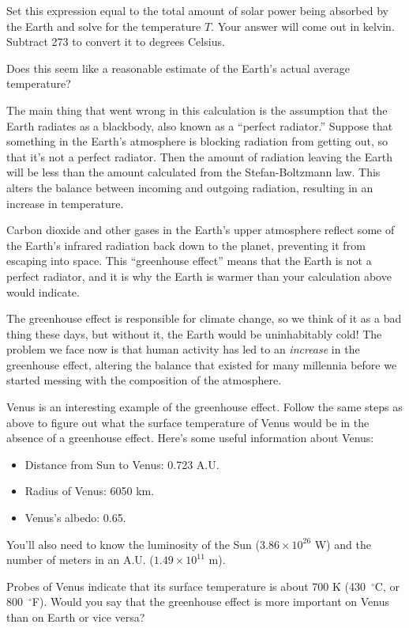 Set this expression equal to the total amount of solar power
being absorbed by the Earth and solve for the temperature $T$.
Your answer will come out in kelvin.  Subtract 273 to convert 
it to degrees Celsius.

\answerspace{1.5in}

Does this seem like a reasonable estimate of the Earth's 
actual average temperature?

\answerspace{1in}

The main thing that went wrong in this calculation is the assumption
that the Earth radiates as a blackbody, also known
as a  ``perfect radiator.''
Suppose that something in the Earth's atmosphere is blocking
radiation from getting out, so that it's not a perfect radiator.
Then the amount of radiation leaving the Earth will be less than 
the amount calculated from the Stefan-Boltzmann law.  This
alters the balance between incoming and outgoing radiation, resulting
in an increase in temperature.

Carbon dioxide and other gases in the Earth's upper atmosphere reflect some of
the Earth's infrared radiation back down to the planet, preventing it from
escaping into space.  This ``greenhouse effect'' means that
the Earth is not a perfect radiator, and it is why
the Earth is warmer than your calculation above would indicate.

The greenhouse effect is responsible for climate change, so
we think of it as a bad thing these days,
but without it, the Earth would be uninhabitably cold!  The
problem we face now is that human activity has led to
an {\it increase} in the
greenhouse effect, altering the balance that existed for 
many millennia before we started messing with the composition of the
atmosphere.

Venus is an interesting example of the greenhouse effect.
Follow the same steps as above to figure out what
the surface temperature of Venus would be in the absence of
a greenhouse effect.  Here's some useful information about Venus:

\begin{itemize}
\item Distance from Sun to Venus: 0.723 A.U.
\item Radius of Venus: 6050 km.
\item Venus's albedo: 0.65.
\end{itemize}

You'll also need to know the luminosity of the Sun ($3.86\times 10^{26}$ W)
and the number of meters in an A.U. ($1.49\times 10^{11}$ m).

\vfil

Probes of Venus indicate that its surface temperature is about 700 K
(430~$^\circ$C, or 800~$^\circ$F).  Would you say that the
greenhouse effect is more important on Venus than on Earth or 
vice versa?

\answerspace{1in}
\eject




